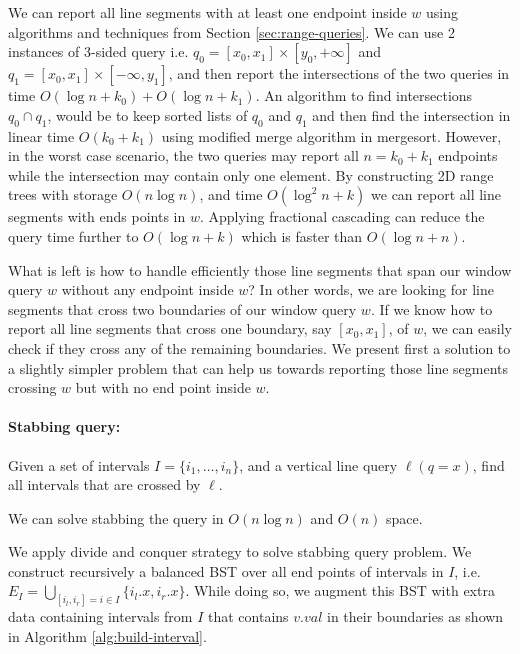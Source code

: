 We can report all line segments with at least one endpoint inside $w$ using algorithms and techniques from Section \ref{sec:range-queries}. 
%
We can use 2 instances of 3-sided query i.e. $ q_0 = [x_0, x_1] \times [y_0, +\infty ]  $ and $q_1 = [x_0, x_1] \times [-\infty,y_1]$, and then report the intersections of the two queries in time $O(\log n + k_0) + O(\log n + k_1) $. 
%
An algorithm to find intersections $q_0 \cap q_1$, would be to keep sorted lists of $q_0$ and $q_1$ and then find the intersection in linear time $O(k_0 + k_1)$ using modified merge algorithm in mergesort.
%
However, in the worst case scenario, the two queries may report all $n = k_0 + k_1$ endpoints while the intersection may contain only one element.
%
By constructing 2D range trees with storage $O(n\log n)$, and time $O(\log^2 n + k)$ we can report all line segments with ends points in $w$. Applying fractional cascading can reduce the query time further to $O(\log n +k)$ which is faster than $O(\log n + n)$.

What is left is how to handle efficiently those line segments that span our window query $w$ without any endpoint inside $w$? 
%
In other words, we are looking for line segments that cross two boundaries of our window query $w$.
% 
If we know how to report all line segments that cross one boundary, say $[x_0, x_1]$, of $w$, we can easily check if they cross any of the remaining boundaries.
%
We present first a solution to a slightly simpler problem that can help us towards reporting those line segments crossing $w$ but with no end point inside $w$.


\paragraph{Stabbing query:} Given a set of intervals $I = \{i_1, \dots, i_n\}$, and a vertical line query $\ell (q = x)$, find all intervals that are crossed by $\ell$. 

\begin{claim}
We can solve stabbing the query in $O(n\log n) $ and $O(n)$ space.
\end{claim}

We apply divide and conquer strategy to solve stabbing query problem. We construct recursively a balanced BST over all end points of intervals in $I$, i.e. $E_{I} = \bigcup_{[i_l, i_r] = i \in I} \{i_l.x, i_r.x\}  $.
%
While doing so, we augment this BST with extra data containing intervals from $I$ that contains $v.val$ in their boundaries as shown in Algorithm \ref{alg:build-interval}.

